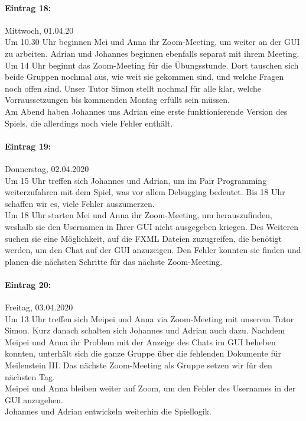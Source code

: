 \documentclass[12pt]{article}
\begin{document}
\paragraph{Eintrag 18:}
Mittwoch, 01.04.20\\
Um 10.30 Uhr beginnen Mei und Anna ihr Zoom-Meeting, um weiter an der GUI zu arbeiten. Adrian und Johannes beginnen ebenfalls separat mit ihrem Meeting.
Um 14 Uhr beginnt das Zoom-Meeting f\"ur die \"Ubungsstunde. Dort tauschen sich beide Gruppen nochmal aus, wie weit sie gekommen sind, und welche Fragen noch offen sind. Unser Tutor Simon stellt nochmal f\"ur alle klar, welche Vorraussetzungen bis kommenden Montag erf\"ullt sein m\"ussen.\\
Am Abend haben Johannes uns Adrian eine erste funktionierende Version des Spiels, die allerdings noch viele Fehler enth\"alt.

\paragraph{Eintrag 19:}
Donnerstag, 02.04.2020\\
Um 15 Uhr treffen sich Johannes und Adrian, um im Pair Programming weiterzufahren mit dem Spiel, was vor allem Debugging bedeutet. Bis 18 Uhr schaffen wir es, viele Fehler auszumerzen.\\
Um 18 Uhr starten Mei und Anna ihr Zoom-Meeting, um herauszufinden, weshalb sie den Usernamen in Ihrer GUI nicht ausgegeben kriegen. Des Weiteren suchen sie eine M\"oglichkeit, auf die FXML Dateien zuzugreifen, die ben\"otigt werden, um den Chat auf der GUI anzuzeigen. Den Fehler konnten sie finden und planen die n\"achsten Schritte f\"ur das n\"achste Zoom-Meeting.

\paragraph{Eintrag 20:}
Freitag, 03.04.2020\\
Um 13 Uhr treffen sich Meipei und Anna via Zoom-Meeting mit unserem Tutor Simon. Kurz danach schalten sich Johannes und Adrian auch dazu. Nachdem Meipei und Anna ihr Problem mit der Anzeige des Chats im GUI beheben konnten, unterh\"alt sich die ganze Gruppe \"uber die fehlenden Dokumente f\"ur Meilenstein III. Das n\"achste Zoom-Meeting als Gruppe setzen wir f\"ur den n\"achsten Tag.\\
Meipei und Anna bleiben weiter auf Zoom, um den Fehler des Usernames in der GUI anzugehen.\\
Johannes und Adrian entwickeln weiterhin die Spiellogik.
\end{document}
